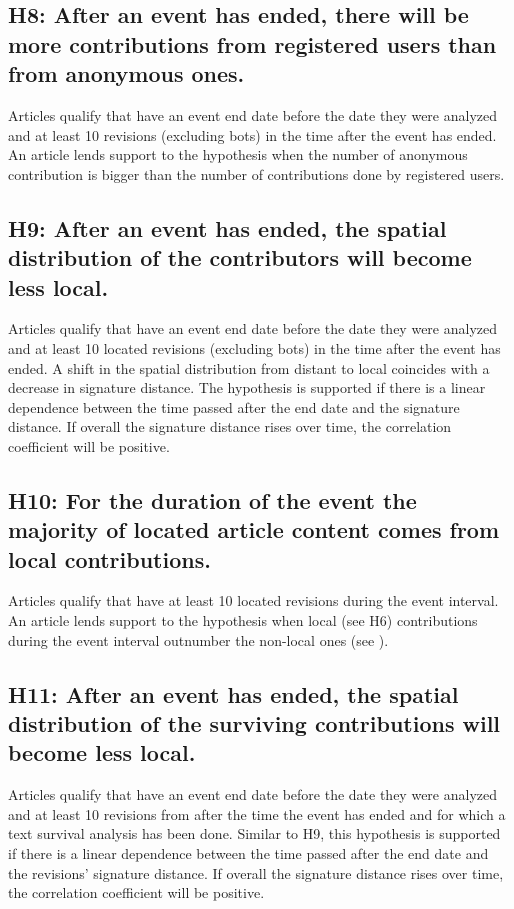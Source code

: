 \subsection*{H8: After an event has ended, there will be more contributions from registered users than from anonymous ones.}

Articles qualify that have an event end date before the date they were analyzed and at least 10 revisions (excluding bots) in the time after the event has ended.
An article lends support to the hypothesis when the number of anonymous contribution is bigger than the number of contributions done by registered users.

\subsection*{H9: After an event has ended, the spatial distribution of the contributors will become less local.}

Articles qualify that have an event end date before the date they were analyzed and at least 10 located revisions (excluding bots) in the time after the event has ended.
A shift in the spatial distribution from distant to local coincides with a decrease in signature distance.
The hypothesis is supported if there is a linear dependence between the time passed after the end date and the signature distance.
If overall the signature distance rises over time, the correlation coefficient will be positive.


\subsection*{H10: For the duration of the event the majority of located article content comes from local contributions.}

Articles qualify that have at least 10 located revisions during the event interval.
An article lends support to the hypothesis when local (see H6) contributions during the event interval outnumber the non-local ones (see ).


\subsection*{H11: After an event has ended, the spatial distribution of the surviving contributions will become less local.}

Articles qualify that have an event end date before the date they were analyzed and at least 10 revisions from after the time the event has ended and for which a text survival analysis has been done.
Similar to H9, this hypothesis is supported if there is a linear dependence between the time passed after the end date and the revisions' signature distance.
If overall the signature distance rises over time, the correlation coefficient will be positive.


